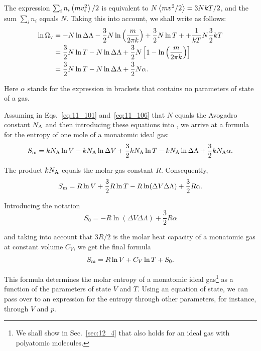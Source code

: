 The expression $\sum_in_i\left(mv_i^2\right)/2$ is equivalent to $N\left\langle mv^2/2 \right\rangle=3NkT/2$, and the sum $\sum_in_i$ equals $N$. Taking this into account, we shall write  as follows:
\begin{align}
	\ln{\Omega_{\text{v}}} &= - N\ln{\Delta\Lambda} - \frac{3}{2} N\ln\left(\frac{m}{2\pi k}\right) + \frac{3}{2}N\ln{T} + + \frac{1}{kT}N \frac{3}{2}kT\nonumber\\
	& = \frac{3}{2}N\ln{T} - N\ln{\Delta\Lambda} + \frac{3}{2}N\left[1 - \ln\left(\frac{m}{2\pi k}\right)\right]\nonumber\\
	&= \frac{3}{2}N\ln{T} - N\ln{\Delta\Lambda} + \frac{3}{2}N\alpha.\label{eq:11_106}
\end{align}

\noindent
Here $\alpha$ stands for the expression in brackets that contains no parameters of state of a gas.

Assuming in Eqs.~\eqref{eq:11_101} and~\eqref{eq:11_106} that $N$ equals the Avogadro constant $N_{\text{A}}$ and then introducing these equations into , we arrive at a formula for the entropy of one mole of a monatomic ideal gas:
\begin{equation*}
	S_{\text{m}} = kN_{\text{A}}\ln{V} - kN_{\text{A}}\ln{\Delta V} + \frac{3}{2}kN_{\text{A}}\ln{T} - kN_{\text{A}}\ln{\Delta\Lambda} + \frac{3}{2}kN_{\text{A}}\alpha.
\end{equation*}

\noindent
The product $kN_{\text{A}}$ equals the molar gas constant $R$. Consequently,
\begin{equation*}
	S_{\text{m}} = R\ln{V} + \frac{3}{2}R\ln{T} - R\ln(\Delta V\Delta\Lambda) + \frac{3}{2}R\alpha.
\end{equation*}

\noindent
Introducing the notation
\begin{equation}\label{eq:11_107}
	S_0 = - R\ln(\Delta V\Delta\Lambda) + \frac{3}{2}R\alpha
\end{equation}

\noindent
and taking into account that $3R/2$ is the molar heat capacity of a monatomic gas at constant volume $C_V$, we get the final formula
\begin{equation}\label{eq:11_108}
	S_{\text{m}} = R\ln{V} + C_V\ln{T} + S_0.
\end{equation}

\noindent
This formula determines the molar entropy of a monatomic ideal gas\footnote{We shall show in Sec.~\ref{sec:12_4} that  also holds for an ideal gas with polyatomic molecules.} as a function of the parameters of state $V$ and $T$. Using an equation of state, we can pass over to an expression for the entropy through other parameters, for instance, through $V$ and $p$.

